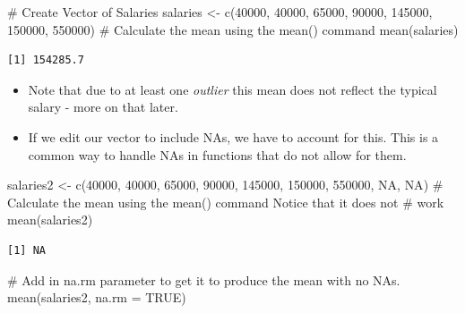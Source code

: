 \documentclass[
  letterpaper,
  DIV=11,
  numbers=noendperiod]{scrreprt}
\newenvironment{Shaded}{\begin{snugshade}}{\end{snugshade}}
\newcommand{\AttributeTok}[1]{\textcolor[rgb]{0.40,0.45,0.13}{#1}}
\newcommand{\CommentTok}[1]{\textcolor[rgb]{0.37,0.37,0.37}{#1}}
\newcommand{\ConstantTok}[1]{\textcolor[rgb]{0.56,0.35,0.01}{#1}}
\newcommand{\DecValTok}[1]{\textcolor[rgb]{0.68,0.00,0.00}{#1}}
\newcommand{\FunctionTok}[1]{\textcolor[rgb]{0.28,0.35,0.67}{#1}}
\newcommand{\NormalTok}[1]{\textcolor[rgb]{0.00,0.23,0.31}{#1}}
\newcommand{\OtherTok}[1]{\textcolor[rgb]{0.00,0.23,0.31}{#1}}
\providecommand{\tightlist}{%
  \setlength{\itemsep}{0pt}\setlength{\parskip}{0pt}}\usepackage{longtable,booktabs,array}
\begin{document}
\begin{Shaded}
\begin{Highlighting}[]
\CommentTok{\# Create Vector of Salaries}
\NormalTok{salaries }\OtherTok{\textless{}{-}} \FunctionTok{c}\NormalTok{(}\DecValTok{40000}\NormalTok{, }\DecValTok{40000}\NormalTok{, }\DecValTok{65000}\NormalTok{, }\DecValTok{90000}\NormalTok{, }\DecValTok{145000}\NormalTok{, }\DecValTok{150000}\NormalTok{, }\DecValTok{550000}\NormalTok{)}
\CommentTok{\# Calculate the mean using the mean() command}
\FunctionTok{mean}\NormalTok{(salaries)}
\end{Highlighting}
\end{Shaded}

\begin{verbatim}
[1] 154285.7
\end{verbatim}

\begin{itemize}
\tightlist
\item
  Note that due to at least one \emph{outlier} this mean does not
  reflect the typical salary - more on that later.
\item
  If we edit our vector to include NAs, we have to account for this.
  This is a common way to handle NAs in functions that do not allow for
  them.
\end{itemize}

\begin{Shaded}
\begin{Highlighting}[]
\NormalTok{salaries2 }\OtherTok{\textless{}{-}} \FunctionTok{c}\NormalTok{(}\DecValTok{40000}\NormalTok{, }\DecValTok{40000}\NormalTok{, }\DecValTok{65000}\NormalTok{, }\DecValTok{90000}\NormalTok{, }\DecValTok{145000}\NormalTok{, }\DecValTok{150000}\NormalTok{, }\DecValTok{550000}\NormalTok{, }\ConstantTok{NA}\NormalTok{,}
    \ConstantTok{NA}\NormalTok{)}
\CommentTok{\# Calculate the mean using the mean() command Notice that it does not}
\CommentTok{\# work}
\FunctionTok{mean}\NormalTok{(salaries2)}
\end{Highlighting}
\end{Shaded}

\begin{verbatim}
[1] NA
\end{verbatim}

\begin{Shaded}
\begin{Highlighting}[]
\CommentTok{\# Add in na.rm parameter to get it to produce the mean with no NAs.}
\FunctionTok{mean}\NormalTok{(salaries2, }\AttributeTok{na.rm =} \ConstantTok{TRUE}\NormalTok{)}
\end{Highlighting}
\end{Shaded}
\end{document}
